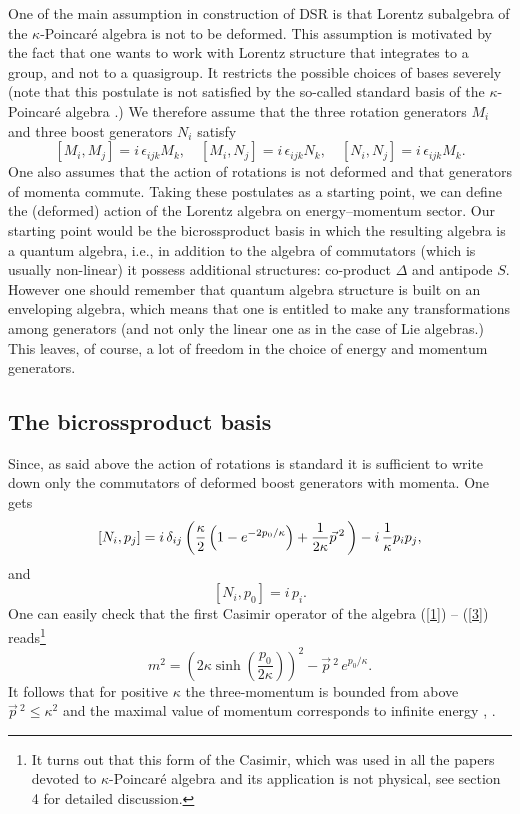 \documentclass[a4paper,a4paper]{article}
\begin{document}
One of the main assumption in construction of DSR is that Lorentz
subalgebra of the $\kappa$-Poincar\'e algebra is  not to be
deformed. This assumption is motivated by the fact that one wants
to work with Lorentz structure that integrates to a group, and not
to a quasigroup. It restricts the possible choices of bases
severely (note that this postulate is not satisfied by the
so-called standard basis of the $\kappa$-Poincar\'e algebra
\cite{lunoruto}.) We therefore assume that the three rotation
generators $M_i$ and three boost generators $N_i$ satisfy
\begin{equation}\label{1}
 [M_i, M_j] = i\, \epsilon_{ijk} M_k, \quad [M_i, N_j] = i\, \epsilon_{ijk} N_k,
 \quad [N_i, N_j] = i\, \epsilon_{ijk} M_k.
\end{equation}
One  also assumes that the action of rotations is not deformed and
that generators of momenta commute. Taking these  postulates as a
starting point, we can define the (deformed) action of the Lorentz
algebra on energy--momentum sector. Our starting point would be
the bicrossproduct basis in which the resulting algebra is a
quantum algebra, i.e., in addition to the algebra of commutators
(which is usually non-linear)  it possess additional structures:
co-product $\Delta$ and antipode $S$. However one should remember
that quantum algebra structure is built on an enveloping algebra,
which means that one is entitled to make any transformations among
generators (and not only the linear one as in the case of Lie
algebras.) This leaves, of course, a lot of freedom in the choice
of energy and momentum generators.

\subsection{The bicrossproduct basis}

Since, as said above the action of rotations is standard it is
sufficient to write down only the commutators  of deformed boost
generators with momenta. One gets \cite{maru}
\begin{equation}\label{2}
   \left[N_{i}, p_{j}\right] = i\,  \delta_{ij}
 \left( {\kappa\over 2} \left(
 1 -e^{-2{p_{0}/ \kappa}}
\right) + {1\over 2\kappa} \vec{p}\,{}^{ 2}\, \right) - i\,
{1\over \kappa} p_{i}p_{j} ,
\end{equation}
and
\begin{equation}\label{3}
  \left[N_{i},p_{0}\right] = i\, p_{i}.
\end{equation}
One can easily check that the first Casimir operator of the
algebra (\ref{1}) -- (\ref{3})  reads\footnote{It turns out that
this form of the Casimir, which was used in all the papers devoted
to $\kappa$-Poincar\'e algebra and its application is not
physical, see section 4 for detailed discussion.}
\begin{equation}\label{6}
 m^2 = \left(2\kappa \sinh \left(\frac{p_0}{2\kappa}\right)\right)^2 - \vec{p}\,{}^2\, e^{p_0/\kappa}.
\end{equation}
It follows that for positive $\kappa$ the three-momentum is
bounded from  above $\vec{p}\,{}^2 \leq \kappa^2$ and the maximal
value of momentum corresponds to infinite energy \cite{jkgminl},
\cite{rbgacjkg}.
\newline
\end{document}
